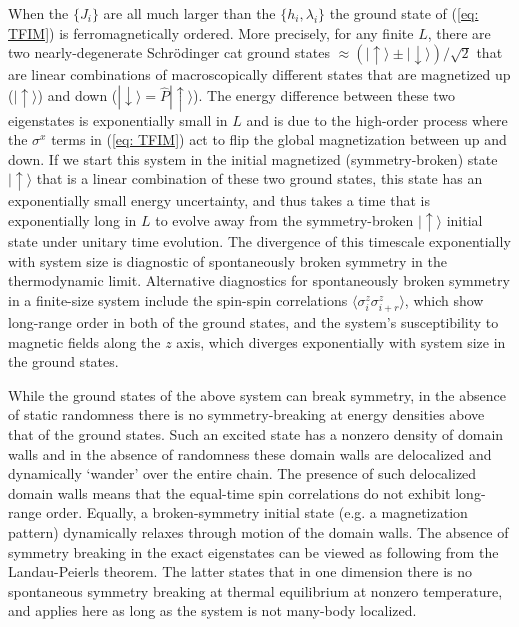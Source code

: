 \documentclass[amsmath,onecolumn, superscriptaddress,preprint,aps]{revtex4}
\begin{document}
When the $\{J_i\}$ are all much larger than the $\{h_i,\lambda_i\}$
  the ground state of (\ref{eq: TFIM}) is ferromagnetically ordered.
  More precisely, for any finite $L$, there are two nearly-degenerate Schr\"odinger cat ground states $\approx (|\uparrow \rangle \pm |\downarrow \rangle)/\sqrt{2}$
  that are linear combinations of macroscopically different states that are magnetized up ($|\uparrow\rangle$) and down ($|\downarrow\rangle=\hat P|\uparrow\rangle$).
  The energy difference between these two eigenstates is exponentially small in $L$ and is due to the high-order process where the $\sigma^x$ terms in (\ref{eq: TFIM})
  act to flip the global magnetization between up and down.
  If we start this system in the initial magnetized (symmetry-broken) state $|\uparrow \rangle$ that is a linear combination of these two ground states,
  this state has an exponentially small energy uncertainty, and thus takes a time that is exponentially long in $L$ to evolve away from the symmetry-broken
  $|\uparrow \rangle$ initial state under unitary time evolution.  The divergence of this timescale exponentially with system size is diagnostic of spontaneously
  broken symmetry in the thermodynamic limit.  Alternative diagnostics for spontaneously broken symmetry in a finite-size system include the spin-spin correlations
  $\langle \sigma^z_i \sigma^z_{i+r} \rangle$, which show long-range order in both of the ground states,
  and the system's susceptibility to magnetic fields along the $z$ axis, which diverges exponentially with system size in the ground states.

  While the ground states of the above system can break symmetry, in the absence of static randomness there is no symmetry-breaking at energy densities
  above that of the ground states.
 Such an excited state has a nonzero density of domain walls
 and in the absence of randomness these domain walls are delocalized and dynamically `wander' over the entire chain.
 The presence of such delocalized domain walls means that the equal-time spin correlations
 do not exhibit long-range order.  Equally, a broken-symmetry initial state (e.g. a magnetization pattern) dynamically relaxes through motion of the domain walls.
 The absence of symmetry breaking in the exact eigenstates can be viewed as following from the Landau-Peierls theorem.  The latter states that in one dimension there is no spontaneous symmetry breaking at thermal equilibrium at nonzero temperature, and applies here as long as the system is not many-body localized.
\end{document}
